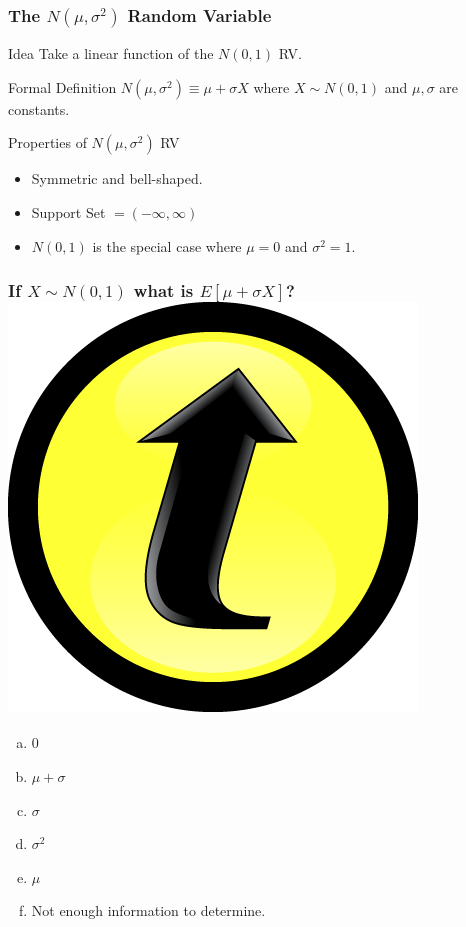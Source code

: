 \documentclass[handout]{beamer}
\begin{document}
\begin{frame}
  \frametitle{The $N(\mu, \sigma^2)$ Random Variable}
  \begin{block}{Idea}
   Take a linear function of the $N(0,1)$ RV.
  \end{block}
  \begin{block}{Formal Definition}
    \alert{$N(\mu, \sigma^2) \equiv \mu + \sigma X$} where $X \sim N(0,1)$ and $\mu, \sigma$ are constants.
  \end{block}
  \begin{block}{Properties of $N(\mu, \sigma^2)$ RV}
    \begin{itemize}
      \item Symmetric and bell-shaped. 
      \item Support Set $=(-\infty,\infty)$
      \item $N(0,1)$ is the special case where $\mu=0$ and $\sigma^2 = 1$. 
    \end{itemize}
  \end{block}
\end{frame}
\begin{frame}
  \frametitle{If $X\sim N(0,1)$ what is $E[\mu + \sigma X]$?\hfill \includegraphics[scale = 0.05]{./images/clicker}}
  \begin{enumerate}[(a)]
    \item 0
    \item $\mu + \sigma$
    \item $\sigma$
    \item $\sigma^2$
    \item $\mu$
    \item Not enough information to determine. 
  \end{enumerate}
\end{frame}
\end{document}
